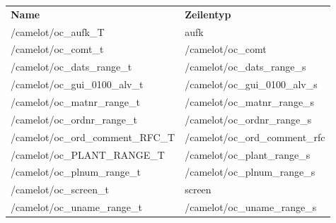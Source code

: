 \begin{tabu}{p{0.50\textwidth}p{0.45\textwidth }}
\rowfont{\bfseries\leavevmode\color{headingfont}}\textbf{Name} & \textbf{Zeilentyp} \\
/camelot/oc\_aufk\_T & aufk \\
/camelot/oc\_comt\_t & /camelot/oc\_comt \\
/camelot/oc\_dats\_range\_t & /camelot/oc\_dats\_range\_s \\
	/camelot/oc\_gui\_0100\_alv\_t & /camelot/oc\_gui\_0100\_alv\_s \\
/camelot/oc\_matnr\_range\_t & /camelot/oc\_matnr\_range\_s \\
/camelot/oc\_ordnr\_range\_t & /camelot/oc\_ordnr\_range\_s \\
/camelot/oc\_ord\_comment\_RFC\_T & /camelot/oc\_ord\_comment\_rfc \\
/camelot/oc\_PLANT\_RANGE\_T & /camelot/oc\_plant\_range\_s \\
/camelot/oc\_plnum\_range\_t & /camelot/oc\_plnum\_range\_s \\
/camelot/oc\_screen\_t & screen \\
/camelot/oc\_uname\_range\_t & /camelot/oc\_uname\_range\_s \\
\end{tabu}